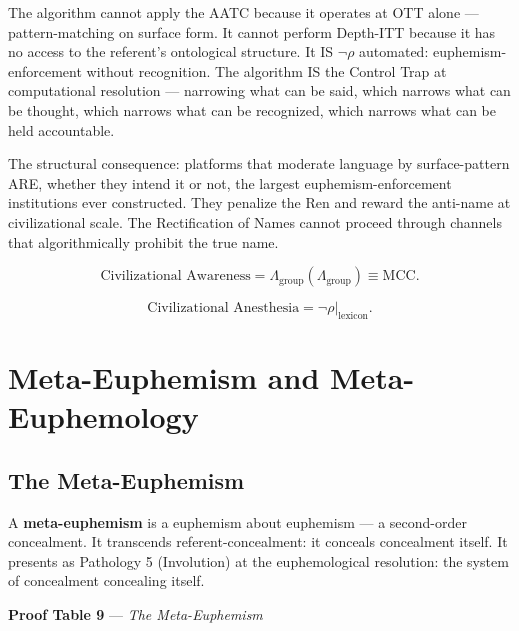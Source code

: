 \documentclass[11pt, oneside]{article}
\theoremstyle{definition}
\begin{document}
The algorithm cannot apply the AATC because it operates at OTT alone --- pattern-matching on surface form. It cannot perform Depth-ITT because it has no access to the referent's ontological structure. It IS $\neg\rho$ automated: euphemism-enforcement without recognition. The algorithm IS the Control Trap at computational resolution --- narrowing what can be said, which narrows what can be thought, which narrows what can be recognized, which narrows what can be held accountable.

The structural consequence: platforms that moderate language by surface-pattern ARE, whether they intend it or not, the largest euphemism-enforcement institutions ever constructed. They penalize the Ren and reward the anti-name at civilizational scale. The Rectification of Names cannot proceed through channels that algorithmically prohibit the true name.

$$\boxed{\text{Civilizational Awareness} = \Lambda_{\text{group}}(\Lambda_{\text{group}}) \equiv \text{MCC}.}$$

$$\boxed{\text{Civilizational Anesthesia} = \neg\rho|_{\text{lexicon}}.}$$

\section{Meta-Euphemism and Meta-Euphemology}

\subsection{The Meta-Euphemism}

A \textbf{meta-euphemism} is a euphemism about euphemism --- a second-order concealment. It transcends referent-concealment: it conceals concealment itself. It presents as Pathology 5 (Involution) at the euphemological resolution: the system of concealment concealing itself.

\textbf{Proof Table 9} --- \textit{The Meta-Euphemism}
\end{document}
